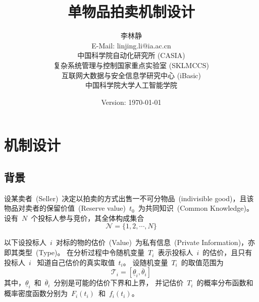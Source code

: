 \documentclass[a4paper,12pt]{article}
\begin{document}
\title{单物品拍卖机制设计}
\author{李林静 \\ 
   E-Mail: linjing.li@ia.ac.cn  \vspace{1cm} \\
 
 
        中国科学院自动化研究所 (CASIA)\\
        复杂系统管理与控制国家重点实验室 (SKLMCCS)\\
        互联网大数据与安全信息学研究中心 (iBasic)  \vspace{1cm} \\ 
 
 
        中国科学院大学人工智能学院 \vspace{5cm}
}

\date{Version: \today}



\maketitle



\newpage



 \section{机制设计}

 \subsection{背景}

设某卖者~(Seller)~决定以拍卖的方式出售一不可分物品~(indivisible
good)，且该物品对卖者的保留价值~(Reserve
value)~$t_0$~为共同知识~(Common Knowledge)。
设有~$N$~个投标人参与竞价，其全体构成集合
\begin{equation*}
    \mathcal{N}=\{1,2,\cdots,N\}
\end{equation*}

以下设投标人~$i$~对标的物的估价~(Value)~为私有信息~(Private
Information)，亦即其类型~(Type)。
在分析过程中令随机变量~$T_i$~表示投标人~$i$~的估价，且只有投标人~$i$~
知道自己估价的真实取值~$t_i$。 设随机变量~$T_i$~的取值范围为
\begin{equation*}
    \mathcal{T}_i=\left[\underline{\theta}_i,\overline{\theta}_i\right]
\end{equation*}
其中，$\underline{\theta}_i$~和~$\overline{\theta}_i$~分别是可能的估价下界和上界，
并记估价~$T_i$~的概率分布函数和概率密度函数分别为~$F_i(t_i)$~和~$f_i(t_i)$。
\end{document}

